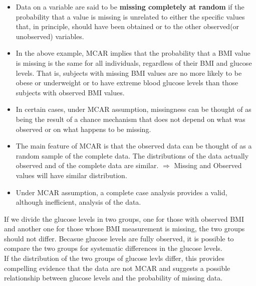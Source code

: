 \documentclass[11pt]{article}
\theoremstyle{break}
\begin{document}
\begin{definition}[MCAR]
    \begin{itemize}
        \item Data on a variable are said to be \textbf{missing completely at
    random} if the probability that a value is missing is unrelated to either
    the specific values that, in principle, should have been obtained or to the
    other observed(or unobserved) variables.
\item  In the above example, MCAR implies that the probability that a
    BMI value is missing is the same for all individuals, regardless of their
    BMI and glucose levels. That is, subjects with missing BMI values are no
    more likely to be obese or underweight or to have extreme blood
    glucose levels than those subjects with observed BMI values.
\item  In certain cases, under MCAR assumption, missingness can be thought of
    as being the result of a chance mechanism that does not depend on what was
    observed or on what happens to be missing.
\item The main feature of MCAR is that the observed data can be thought of as a
    random sample of the complete data. The distributions of the data actually
    observed and of the complete data are similar. $\Rightarrow$ Missing
    and Observed values will have similar distribution.
\item Under MCAR assumption, a complete case analysis provides a valid,
    although inefficient, analysis of the data.
\end{itemize}
\end{definition}

If we divide the glucose levels in two groups, one for those with observed BMI
and another one for those whose BMI measurement is missing, the two groups
should not differ. Becasue glucose levels are fully observed, it is
possible to compare the two groups for systematic differences in the
glucose levels. \\ \indent If the distribution of the two groups of glucose levls
differ, this provides compelling evidence that the data are not MCAR and
suggests a possible relationship between glucose levels and the probability of
missing data.

\newpage
\end{document}
